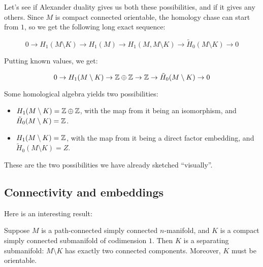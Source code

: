 \documentclass[a4paper]{amsart}
\begin{document}
Let's see if Alexander duality gives us both these possibilities, and
if it gives any others. Since $M$ is compact connected orientable, the
homology chase can start from $1$, so we get the following long exact
sequence:

$$0 \to H_1(M \setminus K) \to H_1(M) \to H_1(M, M \setminus K) \to \tilde{H}_0(M\setminus K) \to 0$$

Putting known values, we get:

$$0 \to H_1(M \setminus K) \to \mathbb{Z} \oplus \mathbb{Z} \to \mathbb{Z} \to \tilde{H}_0(M \setminus K) \to 0$$

Some homological algebra yields two possibilities:

\begin{itemize}

\item $H_1(M \setminus K) = \mathbb{Z} \oplus \mathbb{Z}$, with the map from it being
  an isomorphism, and $\tilde{H}_0(M \setminus K) = \mathbb{Z}$.

\item $H_1(M \setminus K) = \mathbb{Z}$, with the map from it being a direct
  factor embedding, and $\tilde{H}_0(M \setminus K) = Z$.

\end{itemize}

These are the two possibilities we have already sketched ``visually''.

\subsection{Connectivity and embeddings}

Here is an interesting result:

\begin{theorem}
  Suppose $M$ is a path-connected simply connected $n$-manifold, and
  $K$ is a compact simply connected submanifold of codimension
  $1$. Then $K$ is a separating submanifold: $M \setminus K$ has
  exactly two connected components. Moreover, $K$ must be orientable.
\end{theorem}
\end{document}
